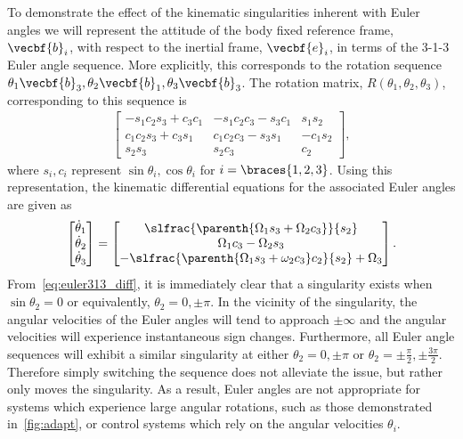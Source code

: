 To demonstrate the effect of the kinematic singularities inherent with Euler angles we will represent the attitude of the body fixed reference frame, \( \vecbf{b}_i \), with respect to the inertial frame, \( \vecbf{e}_i\), in terms of the 3-1-3 Euler angle sequence.
More explicitly, this corresponds to the rotation sequence \( \theta_1 \vecbf{b}_3 , \theta_2 \vecbf{b}_1, \theta_3 \vecbf{b}_3 \).
The rotation matrix, \( R(\theta_1, \theta_2, \theta_3) \), corresponding to this sequence is 
\begin{align}\label{eq:euler313}
    \begin{bmatrix}
        -s_1 c_2 s_3 + c_3 c_1 & -s_1 c_2 c_3 - s_3 c_1 & s_1s_2 \\
        c_1 c_2 s_3 + c_3 s_1 & c_1 c_2 c_3 - s_3 s_1 & - c_1 s_2 \\
        s_2 s_3 & s_2 c_3 & c_2
    \end{bmatrix} ,
\end{align}
where \( s_i, c_i \) represent \( \sin \theta_i, \cos \theta_i \) for \( i = \braces{1,2,3}\).
Using this representation, the kinematic differential equations for the associated Euler angles are given as
\begin{align}\label{eq:euler313_diff}
    \begin{bmatrix}
        \dot{\theta}_1 \\ \dot{\theta}_2 \\ \dot{\theta}_3 
    \end{bmatrix}
    =
    \begin{bmatrix}
        \slfrac{\parenth{\Omega_1 s_3 + \Omega_2 c_3}}{s_2} \\
        \Omega_1 c_3 - \Omega_2 s_3 \\
        -\slfrac{\parenth{\Omega_1 s_3 + \omega_2 c_3}c_2}{s_2} + \Omega_3
    \end{bmatrix} .
\end{align}
From~\cref{eq:euler313_diff}, it is immediately clear that a singularity exists when \( \sin \theta_2 = 0 \) or equivalently, \( \theta_2 = 0, \pm \pi \). 
In the vicinity of the singularity, the angular velocities of the Euler angles will tend to approach \( \pm \infty \) and the angular velocities will experience instantaneous sign changes.
Furthermore, all Euler angle sequences will exhibit a similar singularity at either \( \theta_2 = 0, \pm \pi \) or \( \theta_2 = \pm \frac{\pi}{2}, \pm \frac{3\pi}{2} \).
Therefore simply switching the sequence does not alleviate the issue, but rather only moves the singularity.
As a result, Euler angles are not appropriate for systems which experience large angular rotations, such as those demonstrated in~\cref{fig:adapt}, or control systems which rely on the angular velocities \( \theta_i \).
